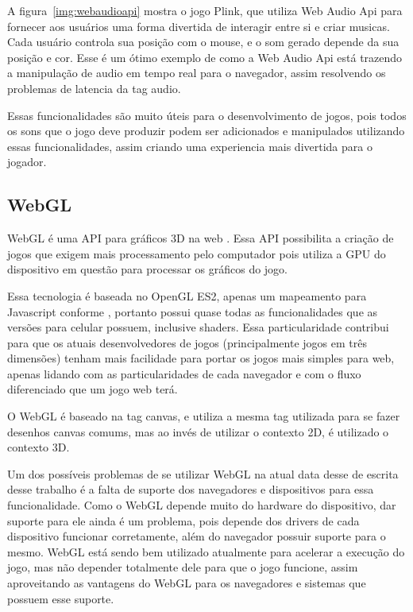 A figura~\ref{img:webaudioapi} mostra o jogo Plink, que utiliza Web
Audio Api para fornecer aos usuários uma forma divertida de interagir
entre si e criar musicas. Cada usuário controla sua posição com o
mouse, e o som gerado depende da sua posição e cor. Esse é um ótimo
exemplo de como a Web Audio Api está trazendo a manipulação de audio
em tempo real para o navegador, assim resolvendo os problemas de
latencia da tag audio.

Essas funcionalidades são muito úteis para o desenvolvimento de jogos, pois
todos os sons que o jogo deve produzir podem ser adicionados e
manipulados utilizando essas funcionalidades, assim criando uma
experiencia mais divertida para o jogador.

\subsection{WebGL}

WebGL é uma API para gráficos 3D na web \cite{lubbers2010pro}. Essa
API possibilita a criação de jogos que exigem mais processamento pelo
computador pois utiliza a GPU do dispositivo em questão para processar
os gráficos do jogo.

Essa tecnologia é baseada no OpenGL ES2, apenas um mapeamento para
Javascript conforme , portanto possui
quase todas as funcionalidades que as versões para celular possuem,
inclusive shaders. Essa particularidade contribui
para que os atuais desenvolvedores de jogos (principalmente jogos em
três dimensões) tenham mais facilidade para portar os jogos mais
simples para web, apenas lidando com as particularidades de cada
navegador e com o fluxo diferenciado que um jogo web terá.

O WebGL é baseado na tag canvas, e utiliza a mesma tag utilizada para
se fazer desenhos canvas comums, mas ao invés de utilizar o contexto
2D, é utilizado o contexto 3D.

Um dos possíveis problemas de se utilizar WebGL na atual data desse
de escrita desse trabalho é a falta de suporte dos navegadores e
dispositivos para essa funcionalidade. Como o WebGL depende muito do
hardware do dispositivo, dar suporte para ele ainda é um problema,
pois depende dos drivers de cada dispositivo funcionar
corretamente, além do navegador possuir suporte para o mesmo.
WebGL está sendo bem utilizado atualmente para acelerar a execução do jogo,
mas não depender totalmente dele para que o jogo funcione, assim
aproveitando as vantagens do WebGL para os navegadores e sistemas que
possuem esse suporte.

